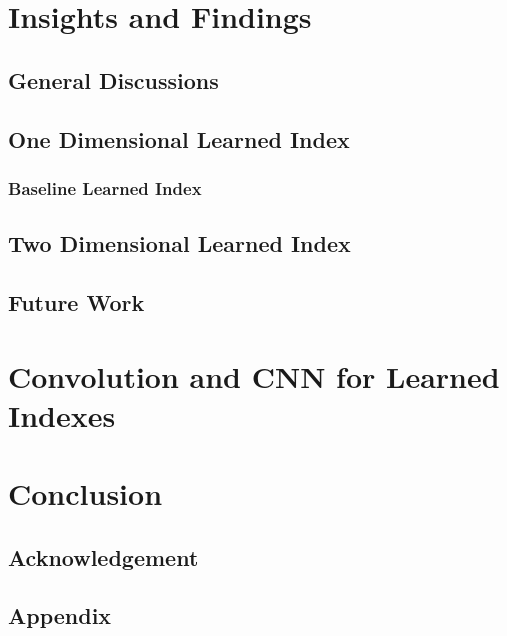 \documentclass[a4paper,12pt]{scrreprt}
\newcounter{conclusion}[chapter]
\begin{document}


\chapter{Insights and Findings}

\section{General Discussions}



\section{One Dimensional Learned Index}

\subsection{Baseline Learned Index}



\section{Two Dimensional Learned Index}



\section{Future Work}

\chapter{Convolution and CNN for Learned Indexes}



\chapter{Conclusion}



\section*{Acknowledgement}



\begin{appendices}
\chapter{Appendix}

\end{appendices}





\end{document}

